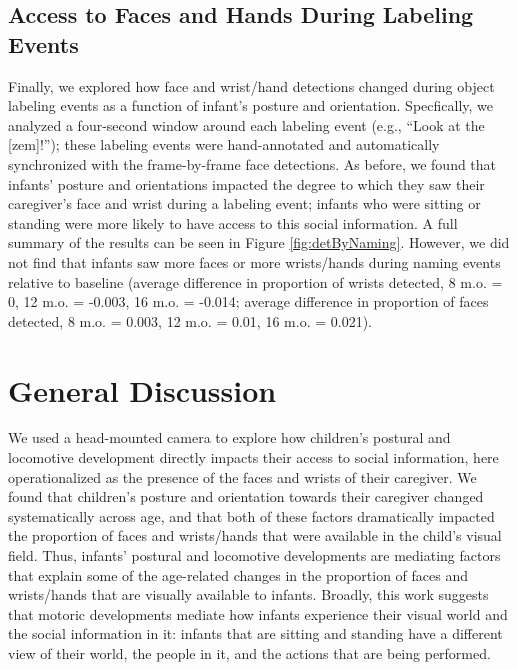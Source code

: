 \documentclass[10pt, letterpaper]{article}
\begin{document}
\subsection{Access to Faces and Hands During Labeling
Events}\label{access-to-faces-and-hands-during-labeling-events}

Finally, we explored how face and wrist/hand detections changed during
object labeling events as a function of infant's posture and
orientation. Specfically, we analyzed a four-second window around each
labeling event (e.g., ``Look at the {[}zem{]}!''); these labeling events
were hand-annotated and automatically synchronized with the
frame-by-frame face detections. As before, we found that infants'
posture and orientations impacted the degree to which they saw their
caregiver's face and wrist during a labeling event; infants who were
sitting or standing were more likely to have access to this social
information. A full summary of the results can be seen in Figure
\ref{fig:detByNaming}. However, we did not find that infants saw more
faces or more wrists/hands during naming events relative to baseline
(average difference in proportion of wrists detected, 8 m.o. = 0, 12
m.o. = -0.003, 16 m.o. = -0.014; average difference in proportion of
faces detected, 8 m.o. = 0.003, 12 m.o. = 0.01, 16 m.o. = 0.021).

\section{General Discussion}\label{general-discussion}

We used a head-mounted camera to explore how children's postural and
locomotive development directly impacts their access to social
information, here operationalized as the presence of the faces and
wrists of their caregiver. We found that children's posture and
orientation towards their caregiver changed systematically across age,
and that both of these factors dramatically impacted the proportion of
faces and wrists/hands that were available in the child's visual field.
Thus, infants' postural and locomotive developments are mediating
factors that explain some of the age-related changes in the proportion
of faces and wrists/hands that are visually available to infants.
Broadly, this work suggests that motoric developments mediate how
infants experience their visual world and the social information in it:
infants that are sitting and standing have a different view of their
world, the people in it, and the actions that are being performed.
\end{document}
